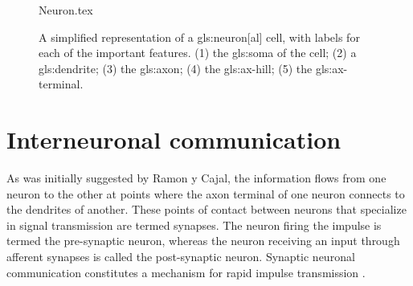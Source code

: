 \documentclass[class={myRUCProject}, crop=false]{standalone}
\begin{document}
\begin{figure}[H]
    \centering
    {Neuron.tex}
    \caption{A simplified representation of a \gls{gls:neuron}[al] cell, with labels for each of the important features. (1) the \gls{gls:soma} of the cell; (2) a \gls{gls:dendrite}; (3) the \gls{gls:axon}; (4) the \gls{gls:ax-hill}; (5) the \gls{gls:ax-terminal}.}\label{fig:Neuron}
\end{figure}



\section{Interneuronal communication}


As was initially suggested by Ramon y Cajal, the information flows from one neuron to the other at points where the axon terminal of one neuron connects to the dendrites of another. These points of contact between neurons that specialize in signal transmission are termed synapses.  The neuron firing the impulse is termed the pre-synaptic neuron, whereas the neuron receiving an input through afferent synapses is called the post-synaptic neuron. Synaptic neuronal communication constitutes a mechanism for rapid impulse transmission \cite{Hammond2015ch6}. 
\end{document}
